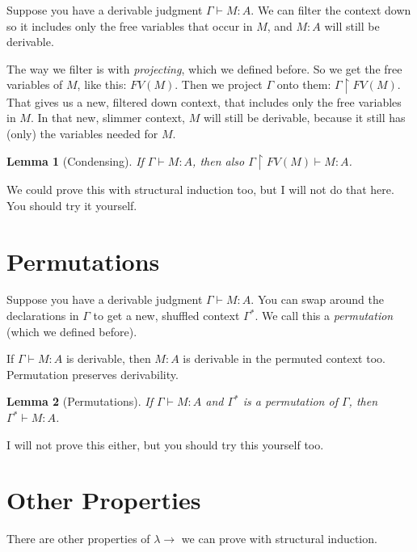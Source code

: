 \documentclass{book}
\numberwithin{equation}{chapter}
\newtheorem{lemma}{Lemma}
\begin{document}
Suppose you have a derivable judgment $\Gamma \vdash M : A$. We can filter the context down so it includes only the free variables that occur in $M$, and $M : A$ will still be derivable. 

The way we filter is with \textit{projecting}, which we defined before. So we get the free variables of $M$, like this: $FV(M)$. Then we project $\Gamma$ onto them: $\Gamma \upharpoonright FV(M)$. That gives us a new, filtered down context, that includes only the free variables in $M$. In that new, slimmer context, $M$ will still be derivable, because it still has (only) the variables needed for $M$.

\begin{lemma}[Condensing]
If $\Gamma \vdash M : A$, then also $\Gamma \upharpoonright FV(M) \vdash M : A$.
\end{lemma}

\noindent
We could prove this with structural induction too, but I will not do that here. You should try it yourself.


\section{Permutations}

Suppose you have a derivable judgment $\Gamma \vdash M : A$. You can swap around the declarations in $\Gamma$ to get a new, shuffled context $\Gamma^{*}$. We call this a \textit{permutation} (which we defined before). 

If $\Gamma \vdash M : A$ is derivable, then $M : A$ is derivable in the permuted context too. Permutation preserves derivability.

\begin{lemma}[Permutations]
If $\Gamma \vdash M : A$ and $\Gamma^{*}$ is a permutation of $\Gamma$, then $\Gamma^{*} \vdash M : A$.
\end{lemma}

\noindent
I will not prove this either, but you should try this yourself too.


\section{Other Properties}

There are other properties of $\lambda\rightarrow$ we can prove with structural induction.
\end{document}
